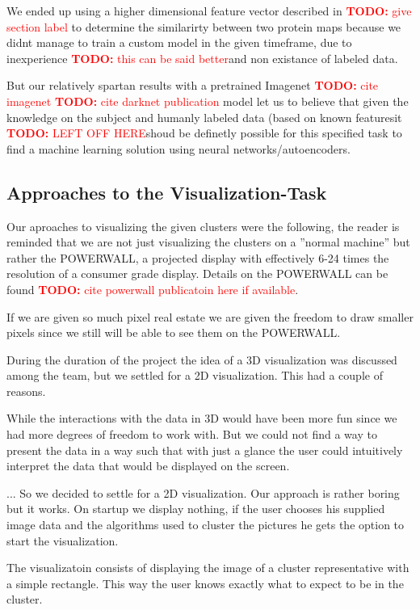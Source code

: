 \documentclass[journal]{vgtc}       %
\newcommand{\todo}[1]{\textcolor{red}{\textbf{TODO:} #1}}
\begin{document}
We ended up using a higher dimensional feature vector described in \todo{give section label} to determine the similarirty between two protein maps because we didnt manage to train a custom model in the given timeframe, due to inexperience \todo{this can be said better}and non existance of labeled data.

But our relatively spartan results with a pretrained Imagenet \todo{cite imagenet} \todo{cite darknet publication} model let us to believe that given the knowledge on the subject and humanly labeled data (based on known featuresit \todo{LEFT OFF HERE}shoud be definetly possible for this specified task to find a machine learning  solution using neural networks/autoencoders.

\subsection{Approaches to the Visualization-Task}

Our aproaches to visualizing the given clusters were the following, the reader is reminded that we are not just visualizing the clusters on a ''normal machine'' but rather the POWERWALL, a projected display with effectively 6-24 times the resolution of a consumer grade display. Details on the POWERWALL can be found \todo{cite powerwall publicatoin here if available}.

If we are given so much pixel real estate we are given the freedom to draw smaller pixels since we still will be able to see them on the POWERWALL.

During the duration of the project the idea of a 3D visualization was discussed among the team, but we settled for a 2D visualization. This had a couple of reasons.

While the interactions with the data in 3D would have been more fun since we had more degrees of freedom to work with.
But we could not find a way to present the data in a way such that with just a glance the user could intuitively interpret the data that would be displayed on the screen.

... So we decided to settle for a 2D visualization. Our approach is rather boring but it works. On startup we display nothing, if the user chooses his supplied image data and the algorithms used to cluster the pictures he gets the option to start the visualization.

The visualizatoin consists of displaying the image of a cluster representative with a simple rectangle. 
This way the user knows exactly what to expect to be in the cluster.
\end{document}
